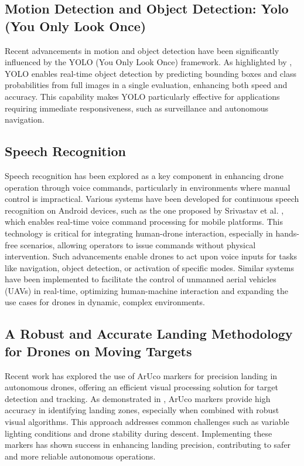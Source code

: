 \documentclass[3p,times]{elsarticle}
\begin{document}
    \subsection{Motion Detection and Object Detection: Yolo (You Only Look Once)}
    Recent advancements in motion and object detection have been significantly influenced by the YOLO (You Only Look Once) framework. As highlighted by \cite{dahirou2021motion}, YOLO enables real-time object detection by predicting bounding boxes and class probabilities from full images in a single evaluation, enhancing both speed and accuracy. This capability makes YOLO particularly effective for applications requiring immediate responsiveness, such as surveillance and autonomous navigation.

    \subsection{Speech Recognition}
    Speech recognition has been explored as a key component in enhancing drone operation through voice commands, particularly in environments where manual control is impractical. Various systems have been developed for continuous speech recognition on Android devices, such as the one proposed by Srivastav et al. \cite{SpeechRecognition}, which enables real-time voice command processing for mobile platforms. This technology is critical for integrating human-drone interaction, especially in hands-free scenarios, allowing operators to issue commands without physical intervention. Such advancements enable drones to act upon voice inputs for tasks like navigation, object detection, or activation of specific modes. Similar systems have been implemented to facilitate the control of unmanned aerial vehicles (UAVs) in real-time, optimizing human-machine interaction and expanding the use cases for drones in dynamic, complex environments.

    \subsection{A Robust and Accurate Landing Methodology for Drones on Moving Targets}
    Recent work has explored the use of ArUco markers for precision landing in autonomous drones, offering an efficient visual processing solution for target detection and tracking. As demonstrated in \cite{drones6040098}, ArUco markers provide high accuracy in identifying landing zones, especially when combined with robust visual algorithms. This approach addresses common challenges such as variable lighting conditions and drone stability during descent. Implementing these markers has shown success in enhancing landing precision, contributing to safer and more reliable autonomous operations.
\end{document}
